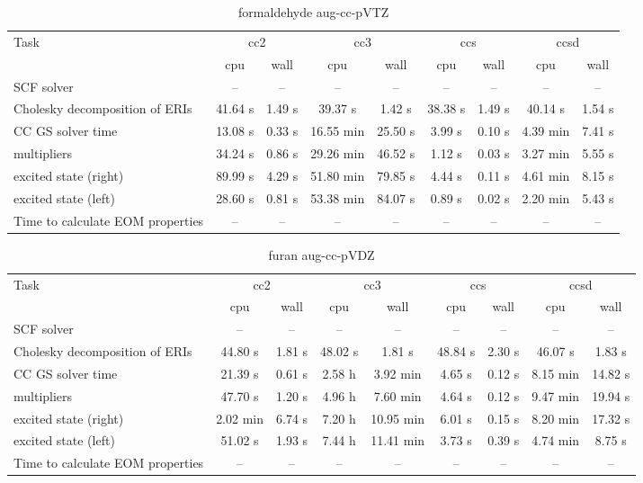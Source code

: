 \documentclass{article}
\begin{document}
\begin{table}
\caption{formaldehyde aug-cc-pVTZ}
\begin{tabular}{lcccccccc}
\toprule
Task & \multicolumn{2}{c}{cc2} & \multicolumn{2}{c}{cc3} & \multicolumn{2}{c}{ccs} & \multicolumn{2}{c}{ccsd}\\
\cmidrule(lr){2-3}\cmidrule(lr){4-5}\cmidrule(lr){6-7}\cmidrule(lr){8-9}
 & cpu & wall & cpu & wall & cpu & wall & cpu & wall\\
\midrule
SCF solver & -- & -- & -- & -- & -- & -- & -- & --\\
Cholesky decomposition of ERIs & 41.64 s & 1.49 s & 39.37 s & 1.42 s & 38.38 s & 1.49 s & 40.14 s & 1.54 s\\
CC GS solver time & 13.08 s & 0.33 s & 16.55 min & 25.50 s & 3.99 s & 0.10 s & 4.39 min & 7.41 s\\
multipliers & 34.24 s & 0.86 s & 29.26 min & 46.52 s & 1.12 s & 0.03 s & 3.27 min & 5.55 s\\
excited state (right) & 89.99 s & 4.29 s & 51.80 min & 79.85 s & 4.44 s & 0.11 s & 4.61 min & 8.15 s\\
excited state (left) & 28.60 s & 0.81 s & 53.38 min & 84.07 s & 0.89 s & 0.02 s & 2.20 min & 5.43 s\\
Time to calculate EOM properties & -- & -- & -- & -- & -- & -- & -- & --\\
\bottomrule
\end{tabular}
\end{table}
\begin{table}
\caption{furan aug-cc-pVDZ}
\begin{tabular}{lcccccccc}
\toprule
Task & \multicolumn{2}{c}{cc2} & \multicolumn{2}{c}{cc3} & \multicolumn{2}{c}{ccs} & \multicolumn{2}{c}{ccsd}\\
\cmidrule(lr){2-3}\cmidrule(lr){4-5}\cmidrule(lr){6-7}\cmidrule(lr){8-9}
 & cpu & wall & cpu & wall & cpu & wall & cpu & wall\\
\midrule
SCF solver & -- & -- & -- & -- & -- & -- & -- & --\\
Cholesky decomposition of ERIs & 44.80 s & 1.81 s & 48.02 s & 1.81 s & 48.84 s & 2.30 s & 46.07 s & 1.83 s\\
CC GS solver time & 21.39 s & 0.61 s & 2.58 h & 3.92 min & 4.65 s & 0.12 s & 8.15 min & 14.82 s\\
multipliers & 47.70 s & 1.20 s & 4.96 h & 7.60 min & 4.64 s & 0.12 s & 9.47 min & 19.94 s\\
excited state (right) & 2.02 min & 6.74 s & 7.20 h & 10.95 min & 6.01 s & 0.15 s & 8.20 min & 17.32 s\\
excited state (left) & 51.02 s & 1.93 s & 7.44 h & 11.41 min & 3.73 s & 0.39 s & 4.74 min & 8.75 s\\
Time to calculate EOM properties & -- & -- & -- & -- & -- & -- & -- & --\\
\bottomrule
\end{tabular}
\end{table}
\end{document}
